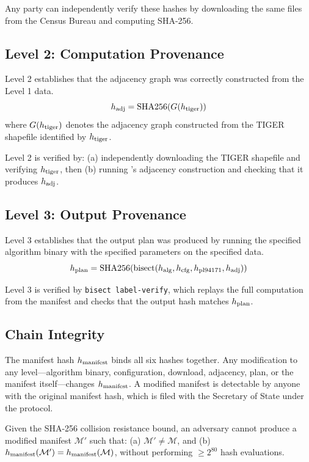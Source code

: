 Any party can independently verify these hashes by downloading the same
files from the Census Bureau and computing SHA-256.

\subsection{Level 2: Computation Provenance}

Level 2 establishes that the adjacency graph was correctly constructed
from the Level 1 data.
\[
  h_{\rm adj} = \mathrm{SHA256}(G(h_{\rm tiger}))
\]
where $G(h_{\rm tiger})$ denotes the adjacency graph constructed from
the TIGER shapefile identified by $h_{\rm tiger}$.

Level 2 is verified by: (a) independently downloading the TIGER shapefile
and verifying $h_{\rm tiger}$, then (b) running \bisect{}'s adjacency
construction and checking that it produces $h_{\rm adj}$.

\subsection{Level 3: Output Provenance}

Level 3 establishes that the output plan was produced by running the
specified algorithm binary with the specified parameters on the specified
data.
\[
  h_{\rm plan} = \mathrm{SHA256}(\text{bisect}(h_{\rm alg}, h_{\rm cfg},
  h_{\rm pl94171}, h_{\rm adj}))
\]

Level 3 is verified by \texttt{bisect label-verify}, which replays
the full computation from the manifest and checks that the output hash
matches $h_{\rm plan}$.

\subsection{Chain Integrity}

The manifest hash $h_{\rm manifest}$ binds all six hashes together.
Any modification to any level---algorithm binary, configuration, download,
adjacency, plan, or the manifest itself---changes $h_{\rm manifest}$.
A modified manifest is detectable by anyone with the original manifest hash,
which is filed with the Secretary of State under the \dia{} protocol.

\begin{theorem}
Given the SHA-256 collision resistance bound, an adversary cannot produce
a modified manifest $\mathcal{M}'$ such that:
(a) $\mathcal{M}' \neq \mathcal{M}$, and
(b) $h_{\rm manifest}(\mathcal{M}') = h_{\rm manifest}(\mathcal{M})$,
without performing $\geq 2^{80}$ hash evaluations.
\end{theorem}
